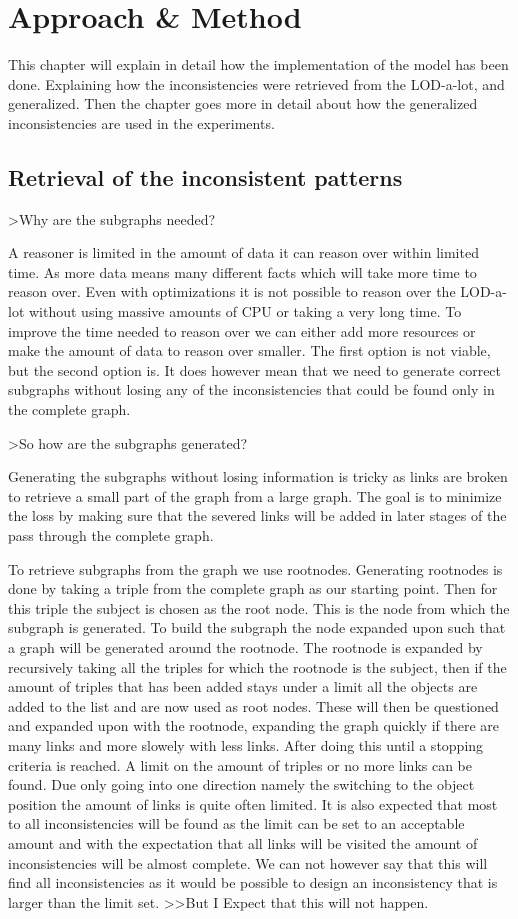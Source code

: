 \documentclass{article}
\begin{document}
\newpage
\section{Approach \& Method}
This chapter will explain in detail how the implementation of the model has been done. Explaining how the inconsistencies were retrieved from the LOD-a-lot, and generalized. Then the chapter goes more in detail about how the generalized inconsistencies are used in the experiments. 

\subsection{Retrieval of the inconsistent patterns}
>Why are the subgraphs needed?

A reasoner is limited in the amount of data it can reason over within limited time. As more data means many different facts which will take more time to reason over. Even with optimizations it is not possible to reason over the LOD-a-lot without using massive amounts of CPU or taking a very long time. To improve the time needed to reason over we can either add more resources or make the amount of data to reason over smaller. The first option is not viable, but the second option is. 
It does however mean that we need to generate correct subgraphs without losing any of the inconsistencies that could be found only in the complete graph.

>So how are the subgraphs generated?

Generating the subgraphs without losing information is tricky as links are broken to retrieve a small part of the graph from a large graph. The goal is to minimize the loss by making sure that the severed links will be added in later stages of the pass through the complete graph.

To retrieve subgraphs from the graph we use rootnodes. Generating rootnodes is done by taking a triple from the complete graph as our starting point. Then for this triple the subject is chosen as the root node. This is the node from which the subgraph is generated. To build the subgraph the node expanded upon such that a graph will be generated around the rootnode. 
The rootnode is expanded by recursively taking all the triples for which the rootnode is the subject, then if the amount of triples that has been added stays under a limit all the objects are added to the list and are now used as root nodes. These will then be questioned and expanded upon with the rootnode, expanding the graph quickly if there are many links and more slowely with less links. After doing this until a stopping criteria is reached. A limit on the amount of triples or no more links can be found. Due only going into one direction namely the switching to the object position the amount of links is quite often limited. 
It is also expected that most to all inconsistencies will be found as the limit can be set to an acceptable amount and with the expectation that all links will be visited the amount of inconsistencies will be almost complete. We can not however say that this will find all inconsistencies as it would be possible to design an inconsistency that is larger than the limit set. >>But I Expect that this will not happen.
\end{document}
